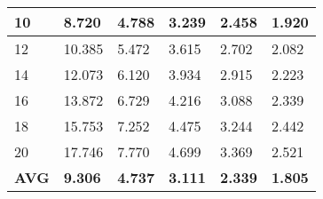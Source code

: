 \begin{table}[t!]
\begin{tabular}{|l|p{0.95cm}|p{0.95cm}|p{0.95cm}|p{0.95cm}|p{0.95cm}|}
		10               & 8.720                                                                    & 4.788                                                                    & 3.239                                                                     & 2.458                                                                     & 1.920                                                                     \\ \hline
		12               & 10.385                                                                   & 5.472                                                                    & 3.615                                                                     & 2.702                                                                     & 2.082                                                                     \\ \hline
		14               & 12.073                                                                   & 6.120                                                                    & 3.934                                                                     & 2.915                                                                     & 2.223                                                                     \\ \hline
		16               & 13.872                                                                   & 6.729                                                                    & 4.216                                                                     & 3.088                                                                     & 2.339                                                                     \\ \hline
		18               & 15.753                                                                   & 7.252                                                                    & 4.475                                                                     & 3.244                                                                     & 2.442                                                                     \\ \hline
		20               & 17.746                                                                   & 7.770                                                                    & 4.699                                                                     & 3.369                                                                     & 2.521                                                                     \\ \hline
		\textbf{AVG} & \textbf{9.306}                                                           & \textbf{4.737}                                                           & \textbf{3.111}                                                            & \textbf{2.339}                                                            & \textbf{1.805}                                                            \\ \hline
	\end{tabular}
	\label{tab:coverage}
\end{table}

